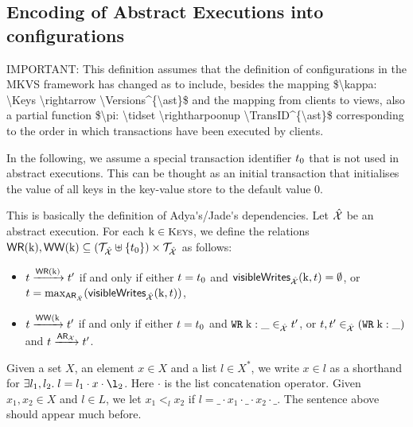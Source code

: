 {\subsection{Encoding of Abstract Executions into configurations}
\ac{IMPORTANT: This definition assumes that the definition of configurations in the MKVS framework has changed as to include, besides 
the mapping $\kappa: \Keys \rightarrow \Versions^{\ast}$ and the mapping from clients to views, 
also a partial function $\pi: \tidset \rightharpoonup \TransID^{\ast}$ corresponding to the order 
in which transactions have been executed by clients.}

In the following, we assume a special transaction identifier $t_0$ that is not used 
in abstract executions. This can be thought as an initial transaction that initialises the value of all 
keys in the key-value store to the default value $0$.
\begin{definition}
\ac{This is basically the definition of Adya's/Jade's dependencies.}
Let $\hat{\mathcal{X}}$ be an abstract execution. For each $\key{k} \in \Addr$, 
we define the relations ${\mathsf{WR}}(\mathrm{k}), {\mathsf{WW}}(\mathrm{k}) \subseteq (\mathcal{T}_{\hat{\mathcal{X}}} \uplus \{t_0\}) \times 
\mathcal{T}_{\hat{\mathcal{X}}}$ as follows: 
\begin{itemize}
\item $t \xrightarrow{{\mathsf{WR}}(\mathrm{k})} t'$ if and only if either $t = t_0$ and 
$\mathsf{visibleWrites}_{\hat{\mathcal{X}}}(\mathrm{k}, t) = \emptyset$, or 
$t = \max_{{\sf{AR}}_{\hat{\mathcal{X}}}}(\mathsf{visibleWrites}_{\hat{\mathcal{X}}}(\mathrm{k}, t))$, 
\item $t \xrightarrow{{\mathsf{WW}}(\mathrm{k}} t'$ if and only if either $t = t_0$ 
and ${{\tt WR}}\;\mathrm{k}: \_ \in_{\hat{\mathcal{X}}} t'$, or $t, t' \in_{\hat{\mathcal{X}}} ({{\tt WR}}\;\mathrm{k}: \_)$ 
and $t \xrightarrow{{\sf{AR}}_{\mathcal{X}}} t'$.
\end{itemize}
\end{definition}

Given a set $X$, an element $x \in X$ and a list $l \in X^{\ast}$, we write 
$x \in l$ as a shorthand for $\exists l_1, l_2. \; l = l_1 \cdot x \cdot \l_2$. 
Here $\cdot$ is the list concatenation operator. Given $x_1, x_2 \in X$ and 
$l \in L$, we let $x_1 <_{l} x_2$ if $l = \_ \cdot x_1 \cdot \_ \cdot x_2 \cdot \_$.
\ac{The sentence above should appear much before.}

}
